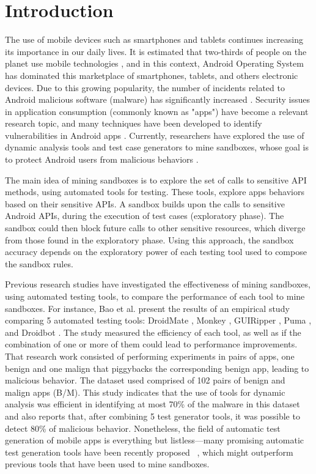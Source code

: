 \section{Introduction}

The use of mobile devices such as smartphones and tablets continues increasing its importance in our daily lives. It is estimated that two-thirds of people on the planet use mobile technologies \cite{Comscore}, and in this context, Android Operating System has dominated this marketplace of smartphones, tablets, and others electronic devices. Due to this growing popularity, the number of incidents related to Android malicious software (malware) has significantly increased \cite{faruki2014android,tan2015securing}. Security issues in application consumption (commonly known as "apps") have become a relevant research topic, and many techniques have been developed to identify vulnerabilities in Android apps \cite{tan2015securing}. Currently, researchers have explored the use of dynamic analysis tools and test case generators to mine sandboxes, whose goal is to protect Android users from malicious behaviors \cite{jamrozik2016mining}.

The main idea of mining sandboxes is to explore the set of calls to sensitive API methods, using automated tools for testing. These tools, explore apps behaviors based on their sensitive APIs. A sandbox builds upon the calls to sensitive Android APIs, during the execution of test cases (exploratory phase). The sandbox could then block future calls to other sensitive resources, which diverge from those found in the exploratory phase. Using this approach, the sandbox accuracy depends on the exploratory power of each testing tool used to compose the sandbox rules.

Previous research studies have investigated the effectiveness of mining sandboxes, using automated testing tools, to compare the performance of each tool to mine sandboxes. For instance, Bao et al. \cite{bao2018mining} present the results of an empirical study comparing 5 automated testing tools: DroidMate \cite{jamrozik2016droidmate}, Monkey \cite{Monkey}, GUIRipper \cite{amalfitano2012using}, Puma \cite{hao2014puma}, and Droidbot \cite{li2017droidbot}. The study measured the efficiency of each tool, as well as if the combination of one or more of them could lead to performance improvements. That research work consisted of performing experiments in pairs of apps, one benign and one malign that piggybacks the corresponding benign app, leading to malicious behavior. The dataset used comprised of 102 pairs of benign and malign apps (B/M). This study indicates that the use of tools for dynamic analysis was efficient in identifying at most 70\% of the malware in this dataset and also reports that, after combining 5 test generator tools, it was possible to detect 80\% of malicious behavior. Nonetheless, the field of automatic test generation of mobile apps is everything but listless---many promising automatic test generation tools have been recently proposed
~\cite{cai2020longitudinal,li2019deep}, which might outperform previous tools that have been used to mine sandboxes.

